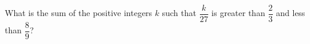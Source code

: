 What is the sum of the positive integers $k$ such that $\dfrac{k}{27}$ is greater than $\dfrac{2}{3}$ and less than $\dfrac{8}{9}$?
